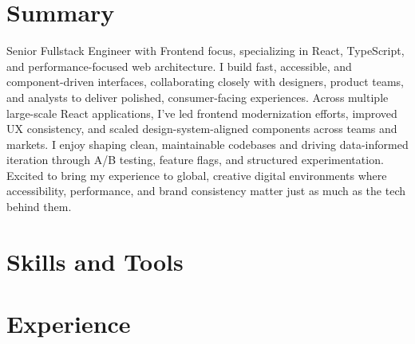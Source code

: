 \documentclass[11pt,a4paper,sans]{moderncv}
\begin{document}
\makecvtitle

\section{Summary}
Senior Fullstack Engineer with Frontend focus, specializing in React, TypeScript, and performance-focused web architecture. I build fast, accessible, and component-driven interfaces, collaborating closely with designers, product teams, and analysts to deliver polished, consumer-facing experiences. Across multiple large-scale React applications, I've led frontend modernization efforts, improved UX consistency, and scaled design-system-aligned components across teams and markets. I enjoy shaping clean, maintainable codebases and driving data-informed iteration through A/B testing, feature flags, and structured experimentation. Excited to bring my experience to global, creative digital environments where accessibility, performance, and brand consistency matter just as much as the tech behind them.


\section{Skills and Tools}


\section{Experience}
\end{document}
